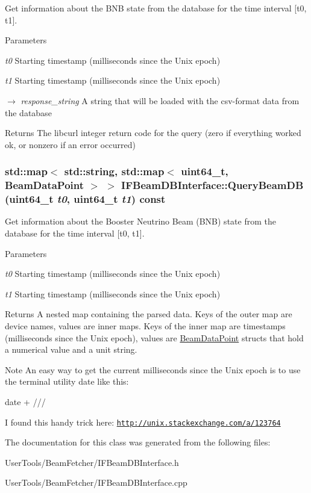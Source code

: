 Get information about the BNB state from the database for the time interval \mbox{[}t0, t1\mbox{]}. 
\begin{DoxyParams}{Parameters}
\item[{\em t0}]Starting timestamp (milliseconds since the Unix epoch) \item[{\em t1}]Starting timestamp (milliseconds since the Unix epoch) \item[\mbox{$\rightarrow$} {\em response\_\-string}]A string that will be loaded with the csv-\/format data from the database \end{DoxyParams}
\begin{DoxyReturn}{Returns}
The libcurl integer return code for the query (zero if everything worked ok, or nonzero if an error occurred) 
\end{DoxyReturn}
\hypertarget{classIFBeamDBInterface_a7b0e4c42767791f1904540b63772a74d}{
\subsubsection[{QueryBeamDB}]{\setlength{\rightskip}{0pt plus 5cm}std::map$<$ std::string, std::map$<$ uint64\_\-t, {\bf BeamDataPoint} $>$ $>$ IFBeamDBInterface::QueryBeamDB (uint64\_\-t {\em t0}, \/  uint64\_\-t {\em t1}) const}}
\label{classIFBeamDBInterface_a7b0e4c42767791f1904540b63772a74d}


Get information about the Booster Neutrino Beam (BNB) state from the database for the time interval \mbox{[}t0, t1\mbox{]}. 
\begin{DoxyParams}{Parameters}
\item[{\em t0}]Starting timestamp (milliseconds since the Unix epoch) \item[{\em t1}]Starting timestamp (milliseconds since the Unix epoch) \end{DoxyParams}
\begin{DoxyReturn}{Returns}
A nested map containing the parsed data. Keys of the outer map are device names, values are inner maps. Keys of the inner map are timestamps (milliseconds since the Unix epoch), values are \hyperlink{structBeamDataPoint}{BeamDataPoint} structs that hold a numerical value and a unit string. 
\end{DoxyReturn}
\begin{DoxyNote}{Note}
An easy way to get the current milliseconds since the Unix epoch is to use the terminal utility date like this: \begin{DoxyVerb}date +%
    /// \end{DoxyVerb}
 I found this handy trick here: \href{http://unix.stackexchange.com/a/123764}{\tt http://unix.stackexchange.com/a/123764} 
\end{DoxyNote}


The documentation for this class was generated from the following files:\begin{DoxyCompactItemize}
\item 
UserTools/BeamFetcher/IFBeamDBInterface.h\item 
UserTools/BeamFetcher/IFBeamDBInterface.cpp\end{DoxyCompactItemize}
